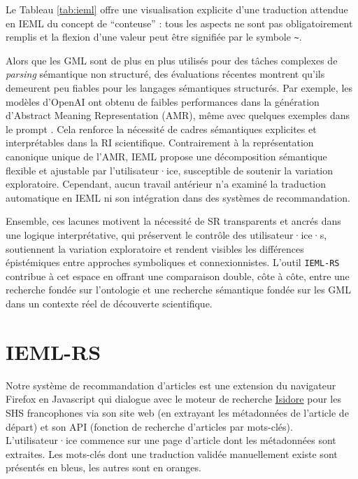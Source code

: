 \documentclass[final,fra]{anthology-ch} %
\begin{document}
Le Tableau \ref{tab:ieml} offre une visualisation explicite d'une traduction attendue
en IEML du concept de ``conteuse'' : tous les aspects ne sont pas
obligatoirement remplis et la flexion d'une valeur peut être signifiée
par le symbole \texttt{\textasciitilde{}}.

Alors que les GML sont de plus en plus utilisés pour des tâches
complexes de \emph{parsing} sémantique non structuré, des évaluations
récentes montrent qu'ils demeurent peu fiables pour les langages
sémantiques structurés. Par exemple, les modèles d'OpenAI ont obtenu de
faibles performances dans la génération d'Abstract Meaning
Representation (AMR), même avec quelques exemples dans le prompt
\autocite{ettingerYouAreExpert2023}. Cela renforce la nécessité de
cadres sémantiques explicites et interprétables dans la RI scientifique.
Contrairement à la représentation canonique unique de l'AMR, IEML
propose une décomposition sémantique flexible et ajustable par
l'utilisateur·ice, susceptible de soutenir la variation exploratoire.
Cependant, aucun travail antérieur n'a examiné la traduction automatique
en IEML ni son intégration dans des systèmes de recommandation.

Ensemble, ces lacunes motivent la nécessité de SR transparents et ancrés
dans une logique interprétative, qui préservent le contrôle des
utilisateur·ice·s, soutiennent la variation exploratoire et rendent
visibles les différences épistémiques entre approches symboliques et
connexionnistes. L'outil \texttt{IEML-RS} contribue à cet espace en
offrant une comparaison double, côte à côte, entre une recherche fondée
sur l'ontologie et une recherche sémantique fondée sur les GML dans un
contexte réel de découverte scientifique.

\section{IEML-RS}\label{ieml-rs}

Notre système de recommandation d'articles est une extension du
navigateur Firefox en Javascript qui dialogue avec le moteur de
recherche \href{https://isidore.science}{Isidore} pour les SHS
francophones via son site web (en extrayant les métadonnées de l'article
de départ) et son API (fonction de recherche d'articles par mots-clés).
L'utilisateur·ice commence sur une page d'article dont les métadonnées
sont extraites. Les mots-clés dont une traduction validée manuellement
existe sont présentés en bleus, les autres sont en oranges.
\end{document}
